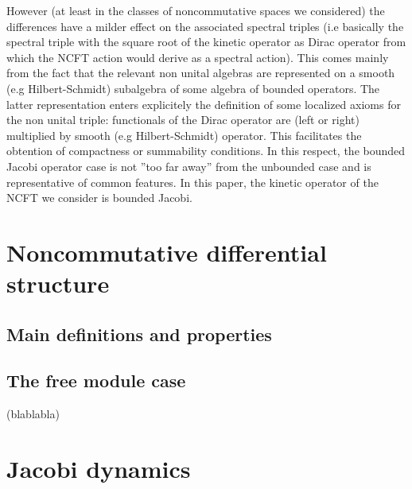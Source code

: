 \documentclass[10pt]{book}
\theoremstyle{break}
\begin{document}
However (at least in the classes of noncommutative spaces we considered) the differences have a milder effect on the associated spectral triples (i.e basically the spectral triple with the square root of the kinetic operator as Dirac operator from which the NCFT action would derive as a spectral action). This comes mainly from the fact that the relevant non unital algebras are represented on a smooth (e.g Hilbert-Schmidt) subalgebra of some algebra of bounded operators. The latter representation enters explicitely the definition of some localized axioms for the non unital triple: functionals of the Dirac operator are (left or right) multiplied by smooth (e.g Hilbert-Schmidt) operator. This facilitates the obtention of compactness or summability conditions. In this respect, the bounded Jacobi operator case is not ''too far away'' from the unbounded case and is representative of common features. In this paper, the kinetic operator of the NCFT we consider is bounded Jacobi.\par


\chapter{Noncommutative differential structure}

\section{Main definitions and properties}


\section{The free module case}


(blablabla)


\chapter{Jacobi dynamics}
\end{document}
